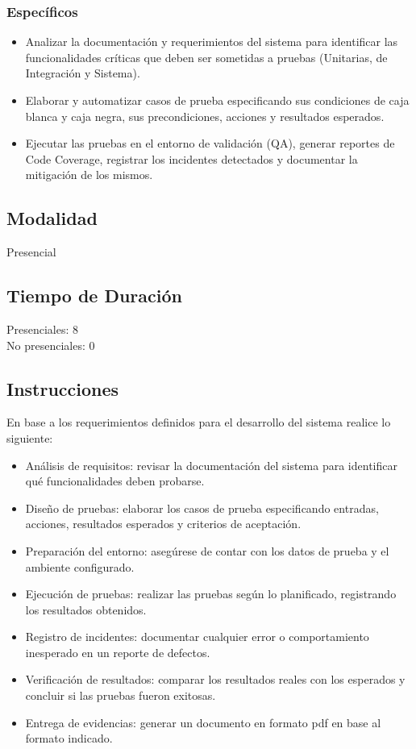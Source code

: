 \documentclass{article}
\begin{document}
\subsubsection{Específicos}
\begin{itemize}
    \item Analizar la documentación y requerimientos del sistema para identificar las funcionalidades críticas que deben ser sometidas a pruebas (Unitarias, de Integración y Sistema).
    \item Elaborar y automatizar casos de prueba especificando sus condiciones de caja blanca y caja negra, sus precondiciones, acciones y resultados esperados.
    \item Ejecutar las pruebas en el entorno de validación (QA), generar reportes de Code Coverage, registrar los incidentes detectados y documentar la mitigación de los mismos.
\end{itemize}

\subsection{Modalidad}
Presencial

\subsection{Tiempo de Duración}
Presenciales: 8\\
\indent No presenciales: 0

\subsection{Instrucciones}
En base a los requerimientos definidos para el desarrollo del sistema realice lo siguiente:
\begin{itemize}
    \item Análisis de requisitos: revisar la documentación del sistema para identificar qué funcionalidades deben probarse.
    \item Diseño de pruebas: elaborar los casos de prueba especificando entradas, acciones, resultados esperados y criterios de aceptación.
    \item Preparación del entorno: asegúrese de contar con los datos de prueba y el ambiente configurado.
    \item Ejecución de pruebas: realizar las pruebas según lo planificado, registrando los resultados obtenidos.
    \item Registro de incidentes: documentar cualquier error o comportamiento inesperado en un reporte de defectos.
    \item Verificación de resultados: comparar los resultados reales con los esperados y concluir si las pruebas fueron exitosas.
    \item Entrega de evidencias: generar un documento en formato pdf en base al formato indicado.
\end{itemize}
\end{document}
